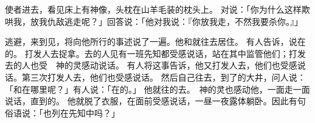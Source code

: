 {使者进去，看见床上有神像，头枕在山羊毛装的枕头上。
对{}说：「你为什么这样欺哄我，放我仇敌逃走呢？」{}回答说：「他对我说：『你放我走，不然我要杀你。』」
\par }{\PP {}逃避，来到{}见{}，将{}向他所行的事述说了一遍。他和{}就往{}去居住。
有人告诉{}，说{}在{}的{}。
打发人去捉拿{}。去的人见有一班先知都受感说话，{}站在其中监管他们；打发去的人也受　神的灵感动说话。
有人将这事告诉{}，他又打发人去，他们也受感说话。{}第三次打发人去，他们也受感说话。
然后{}自己往{}去，到了{}的大井，问人说：「{}和{}在哪里呢？」有人说：「在{}的{}。」
他就往{}的{}去。　神的灵也感动他，一面走一面说话，直到{}的{}。
他就脱了衣服，在{}面前受感说话，一昼一夜露体躺卧。因此有句俗语说：「{}也列在先知中吗？」

}
